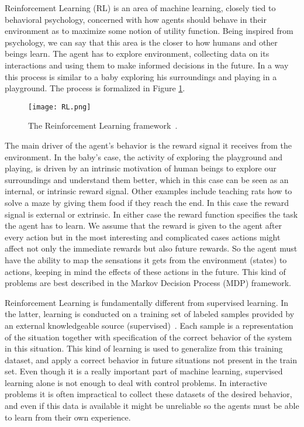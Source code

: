 Reinforcement Learning (RL) is an area of machine learning, closely tied to behavioral psychology, concerned with how agents should behave in their environment as to maximize some notion of utility function. Being inspired from psychology, we can say that this area is the closer to how humans and other beings learn.  The agent has to explore  environment, collecting data on its interactions and using them to make informed decisions in the future. In a way this process is similar to a baby exploring his surroundings and playing in a playground. The process is formalized in Figure \ref{fig:rl_framework}.\par
\begin{figure}
  \texttt{[image: RL.png]}
  \caption{The Reinforcement Learning framework~\cite{Sutton:1998:IRL:551283}.}
  \label{fig:rl_framework}
\end{figure}
The main driver of the agent's behavior is the reward signal it receives from the environment.  In the baby's case, the activity of exploring the playground and playing, is driven by an intrinsic motivation of human beings to explore our surroundings and understand them better, which in this case can be seen as an internal, or intrinsic reward signal. Other examples include teaching rats how to solve a maze by giving them food if they reach the end. In this case the reward signal is external or extrinsic. In either case the reward function  specifies the task the agent has to learn. We assume that the reward is given to the agent after every action but in the most interesting and complicated cases actions might affect not only the immediate rewards but also future rewards. So the agent must have the ability to map the sensations it gets from the environment (states) to actions, keeping in mind the effects of these actions in the future. This kind of problems are best described in the Markov Decision Process (MDP) framework.\par
Reinforcement Learning is fundamentally different from supervised learning. In the latter, learning is conducted on a training set of labeled samples provided by an external knowledgeable source (supervised)~\cite{hastie_09_elements-of.statistical-learning}. Each sample is a representation of the situation together with specification of the correct behavior of the system in this situation. This kind of learning is used to generalize from this training dataset, and apply a correct behavior in future situations not present in the train set. Even though it is a really important part of machine learning, supervised learning alone is not enough to deal with control problems. In interactive problems it is often impractical to collect these datasets of the desired behavior, and even if this data is available it might be unreliable so the agents must be able to learn from their own experience. \par
